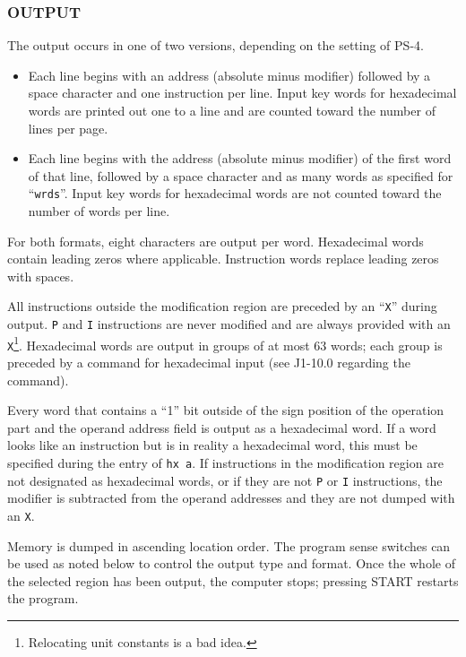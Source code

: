 \subsubsection*{OUTPUT}
The output occurs in one of two versions, depending on the setting of \textsf{PS-4}.
\begin{itemize}
    \item[a\textsf{ON})] Each line begins with an address (absolute minus modifier) followed by a space character and one instruction per line. Input key words for hexadecimal words are printed out one to a line and are counted toward the number of lines per page.
    \item[\textsf{OFF})] Each line begins with the address (absolute minus modifier) of the first word of that line, followed by a space character and as many words as specified for ``\texttt{wrds}''. Input key words for hexadecimal words are not counted toward the number of words per line.
\end{itemize}
For both formats, eight characters are output per word. Hexadecimal words contain leading zeros where applicable. Instruction words replace leading zeros with spaces.

All instructions outside the modification region are preceded by an ``\texttt{X}'' during output. \texttt{P} and \texttt{I} instructions are never modified and are always provided with an \texttt{X}\footnote{Relocating unit constants is a bad idea.}. Hexadecimal words are output in groups of at most 63 words; each group is preceded by a command for hexadecimal input (see J1-10.0 regarding the command).

Every word that contains a ``1'' bit outside of the sign position of the operation part and the operand address field is output as a hexadecimal word. If a word looks like an instruction but is in reality a hexadecimal word, this must be specified during the entry of \texttt{hx a}. If instructions in the modification region are not designated as hexadecimal words, or if they are not \texttt{P} or \texttt{I} instructions, the modifier is subtracted from the operand addresses and they are not dumped with an \texttt{X}.

Memory is dumped in ascending location order. The program sense switches can be used as noted below to control the output type and format. Once the whole of the selected region has been output, the computer stops; pressing \textsf{START} restarts the program.

